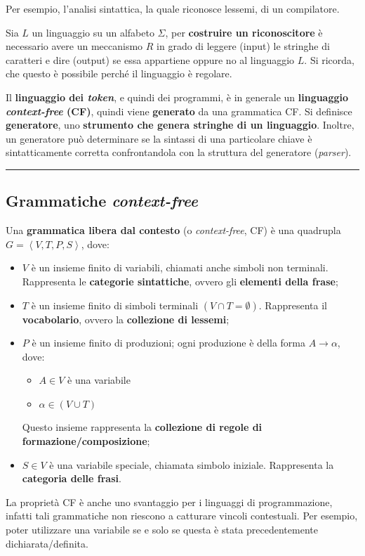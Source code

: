 \documentclass[a4paper]{article}
\newcommand{\longline}{\noindent\rule{\textwidth}{0.4pt}}
\begin{document}
	\noindent
	Per esempio, l'analisi sintattica, la quale riconosce lessemi, di un compilatore.\newline

	\noindent
	Sia $L$ un linguaggio su un alfabeto $\Sigma$, per \textbf{costruire un riconoscitore} è necessario avere un meccanismo $R$ in grado di leggere (input) le stringhe di caratteri e dire (output) se essa appartiene oppure no al linguaggio $L$. Si ricorda, che questo è possibile perché il linguaggio è regolare.\newline

	\noindent
	Il \textbf{linguaggio dei \emph{token}}, e quindi dei programmi, è in generale un \textbf{linguaggio \emph{context-free} (CF)}, quindi viene \textbf{generato} da una grammatica CF. Si definisce \textcolor{Red3}{\textbf{generatore}}, uno \textbf{strumento che genera stringhe di un linguaggio}. Inoltre, un generatore può determinare se la sintassi di una particolare chiave è sintatticamente corretta confrontandola con la struttura del generatore (\emph{parser}).

	\longline

	\subsection{Grammatiche \emph{context-free}}

	Una \textcolor{Red3}{\textbf{grammatica libera dal contesto}} (o \emph{context-free}, CF) è una quadrupla $G = \left\langle V, T, P, S \right\rangle$, dove:
	\begin{itemize}
		\item $V$ è un insieme finito di variabili, chiamati anche simboli non terminali. Rappresenta le \textbf{categorie sintattiche}, ovvero gli \textbf{elementi della frase};
		\item $T$ è un insieme finito di simboli terminali $\left(V \cap T = \emptyset\right)$. Rappresenta il \textbf{vocabolario}, ovvero la \textbf{collezione di lessemi};
		\item $P$ è un insieme finito di produzioni; ogni produzione è della forma $A \rightarrow \alpha$, dove:
		\begin{itemize}
			\item $A \in V$ è una variabile
			\item $\alpha \in \left(V \cup T\right)$
		\end{itemize}
		Questo insieme rappresenta la \textbf{collezione di regole di formazione/composizione};
		\item $S \in V$ è una variabile speciale, chiamata simbolo iniziale. Rappresenta la \textbf{categoria delle frasi}.
	\end{itemize}
	La proprietà CF è anche uno svantaggio per i linguaggi di programmazione, infatti tali grammatiche non riescono a catturare vincoli contestuali. Per esempio, poter utilizzare una variabile se e solo se questa è stata precedentemente dichiarata/definita.\newpage
\end{document}
